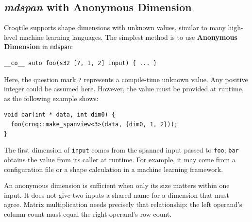 \subsection*{\emph{mdspan} with \textbf{Anonymous Dimension}}

Croqtile supports shape dimensions with unknown values, similar to many high-level machine learning languages. The simplest method is to use \textbf{Anonymous Dimension} in \texttt{mdspan}:

\begin{lstlisting}[language=croqtile,caption={A kernel with an unknown dimension}]
__co__ auto foo(s32 [?, 1, 2] input) { ... }
\end{lstlisting}

Here, the question mark \texttt{?} represents a compile-time unknown value. Any positive integer could be assumed here. However, the value must be provided at runtime, as the following example shows:

\begin{lstlisting}[language={},caption={The caller supplying that dimension}]
void bar(int * data, int dim0) {
  foo(croq::make_spanview<3>(data, {dim0, 1, 2}));
}
\end{lstlisting}

The first dimension of \texttt{input} comes from the spanned input passed to \texttt{foo}; \texttt{bar} obtains the value from its caller at runtime. For example, it may come from a configuration file or a shape calculation in a machine learning framework.

An anonymous dimension is sufficient when only its size matters within one input. It does not give two inputs a shared name for a dimension that must agree. Matrix multiplication needs precisely that relationship: the left operand's column count must equal the right operand's row count.
